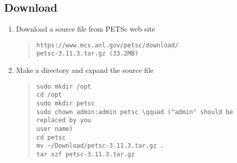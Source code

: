 \documentclass[11pt]{article}
\begin{document}
\subsection{Download}
\begin{enumerate}
\item
Download a source file from PETSc web site
\begin{quote}
\begin{verbatim}
https://www.mcs.anl.gov/petsc/download/
petsc-3.11.3.tar.gz (33.2MB)
\end{verbatim}
\end{quote}
\item
Make a directory and expand the source file
\begin{quote}
\begin{verbatim}
sudo mkdir /opt
cd /opt
sudo mkdir petsc
sudo chown admin:admin petsc \qquad ("admin" should be replaced by you
user name)
cd petsc
mv ~/Download/petsc-3.11.3.tar.gz .
tar xzf petsc-3.11.3.tar.gz
\end{verbatim}
\end{quote}
\end{enumerate}
\end{document}

